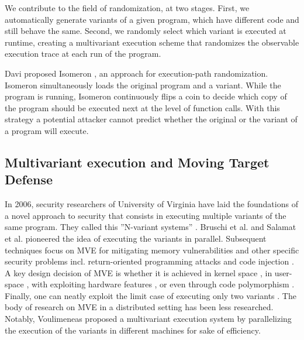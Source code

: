 We contribute to the field of randomization, at two stages. First, we automatically generate variants of a given program, which have different  \wasm code and still behave the same. Second, we randomly select which variant is executed at runtime, creating a multivariant execution scheme that randomizes the observable execution trace at each run of the program.

Davi \etal proposed Isomeron \cite{davi2015isomeron}, an approach 
for execution-path randomization.
Isomeron simultaneously loads the original program and a variant. While the program is running, Isomeron continuously flips a coin to decide which copy of the program should be executed next at the level of function calls. With this strategy a potential attacker cannot predict whether the original or the variant of a program will execute.


\subsection*{Multivariant execution and Moving Target Defense}
\label{sota:multivariantex}


In 2006, security researchers of University of Virginia have laid the foundations of a novel approach to security that consists in executing multiple variants of the same program. They called this ''N-variant systems'' \cite{cox06}. 
Bruschi et al. \cite{bruschi2007diversified} and Salamat et al. \cite{salamat2007stopping} pioneered the idea of executing the variants in parallel.
Subsequent techniques focus on MVE for mitigating memory vulnerabilities \cite{lu2018stopping}
and other specific security problems incl. return-oriented programming attacks \cite{volckaert2015cloning} and code injection \cite{SalamatJWWF11}.
A key design decision of MVE is whether it is achieved in kernel space \cite{osterlund2019kmvx}, in user-space \cite{salamat2009orchestra},
with exploiting hardware features \cite{koning2016secure}, or even through code polymorphism \cite{10.1145/3281662}.
Finally, one can neatly exploit the limit case of executing only two variants \cite{maurer2012tachyon, davi2015isomeron,Kim2015}.
The body of research on MVE in a distributed setting has been less researched.
Notably, Voulimeneas \etal proposed a multivariant execution system by parallelizing the execution of the variants in different machines \cite{voulimeneas2021dmvx} for sake of efficiency.


